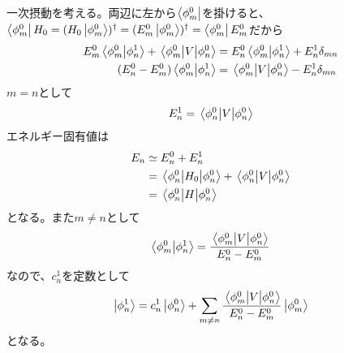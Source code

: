    一次摂動を考える。両辺に左から$\bra{\phi_m^0}$を掛けると、$\bra{\phi_m^0}H_0 = (H_0\ket{\phi_m^0})^\dagger = (E_m^0\ket{\phi_m^0})^\dagger = \bra{\phi_m^0}E_m^0$だから
    \begin{align*}
        E_m^0\braket{\phi_m^0}{\phi_n^1} + \mel{\phi_m^0}{V}{\phi_n^0} &= E_n^0\braket{\phi_m^0}{\phi_n^1} + E_n^1\delta_{mn}\\
        (E_n^0 - E_m^0)\braket{\phi_m^0}{\phi_n^1} &= \mel{\phi_m^0}{V}{\phi_n^0} - E_n^1\delta_{mn}
    \end{align*}
    $m = n$として
        \[E_n^1 = \ev{V}{\phi_n^0}\]
    エネルギー固有値は
    \begin{align*}
        E_n &\simeq E_n^0 + E_n^1\\
            &= \ev{H_0}{\phi_n^0} + \ev{V}{\phi_n^0}\\
            &= \ev{H}{\phi_n^0}
    \end{align*}
    となる。また$m \neq n$として
        \[\braket{\phi_m^0}{\phi_n^1} = \frac{\mel{\phi_m^0}{V}{\phi_n^0}}{E_n^0 - E_m^0}\]
    なので、$c_n^1$を定数として
        \[\ket{\phi_n^1} = c_n^1\ket{\phi_n^0} + \sum_{m \neq n} \frac{\mel{\phi_m^0}{V}{\phi_n^0}}{E_n^0 - E_m^0}\ket{\phi_m^0}\]
    となる。

